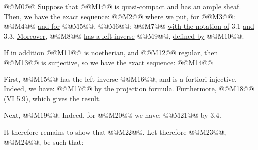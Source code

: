 @@M0@@
\uline{Suppose that} @@M1@@ \uline{is quasi-compact and has an ample sheaf}. \uline{Then}, \uline{we have the exact sequence}:
@@M2@@
\uline{where we put}, \uline{for} @@M3@@:
@@M4@@
\uline{and for} @@M5@@, @@M6@@:
@@M7@@
\uline{with the notation of} 3.1 \uline{and} 3.3. \uline{Moreover}, @@M8@@ \uline{has a left inverse} @@M9@@, \uline{defined by} @@M10@@.

\uline{If in addition} @@M11@@ \uline{is noetherian}, \uline{and} @@M12@@ \uline{regular}, \uline{then} @@M13@@ \uline{is surjective}, \uline{so we have the exact sequence}:
@@M14@@

First, @@M15@@ has the left inverse @@M16@@, and is a fortiori injective. Indeed, we have:
@@M17@@
by the projection formula. Furthermore, @@M18@@ (VI 5.9), which gives the result.

Next, @@M19@@. Indeed, for @@M20@@ we have:
@@M21@@
by 3.4.

It therefore remains to show that @@M22@@. Let therefore @@M23@@, @@M24@@, be such that:
